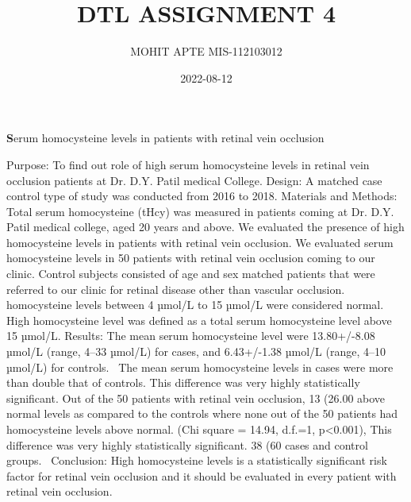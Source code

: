 \documentclass[11pt,a4paper]{report}
\author{MOHIT APTE MIS-112103012}
\title{DTL ASSIGNMENT 4}
\date{2022-08-12}
\begin{document}
\maketitle

\begin{LARGE}

\begin{center}
\textbf Serum homocysteine levels in patients with retinal vein occlusion
\end{center}
\end{LARGE}


Purpose: To find out role of high serum homocysteine levels in retinal vein occlusion patients at Dr. D.Y. Patil medical College.
Design: A matched case control type of study was conducted from 2016 to 2018.
Materials and Methods: Total serum homocysteine (tHcy) was measured in patients coming at Dr. D.Y. Patil medical college, aged 20
years and above. We evaluated the presence of high homocysteine levels in patients with retinal vein occlusion. We evaluated serum
homocysteine levels in 50 patients with retinal vein occlusion coming to our clinic. Control subjects consisted of age and sex matched
patients that were referred to our clinic for retinal disease other than vascular occlusion.~\cite{a} homocysteine levels between 4 µmol/L to 15
µmol/L were considered normal. High homocysteine level was defined as a total serum homocysteine level above 15 µmol/L.
Results: The mean serum homocysteine level were 13.80+/-8.08 µmol/L (range, 4–33 µmol/L) for cases, and 6.43+/-1.38 µmol/L (range,
4–10 µmol/L) for controls.~\cite{b} The mean serum homocysteine levels in cases were more than double that of controls. This difference was very
highly statistically significant. Out of the 50 patients with retinal vein occlusion, 13 (26.00%
above normal levels as compared to the controls where none out of the 50 patients had homocysteine levels above normal. (Chi square =
14.94, d.f.=1, p<0.001), This difference was very highly statistically significant. 38 (60%
cases and control groups.~\cite{c}
Conclusion: High homocysteine levels is a statistically significant risk factor for retinal vein occlusion and it should be evaluated in every
patient with retinal vein occlusion.~\cite{d}
\end{document}
